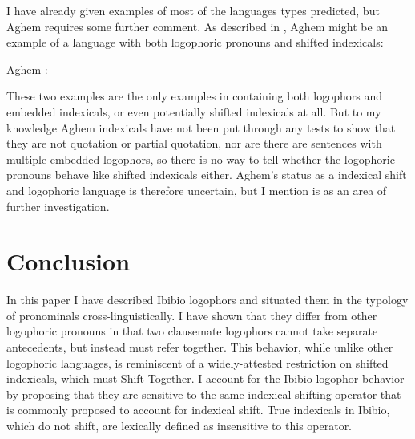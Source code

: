 \documentclass[output=paper]{langscibook}
\begin{document}
I have already given examples of most of the languages types predicted, but Aghem requires some further comment. As described in \citet{Hyman1979}, Aghem might be an example of a language with both logophoric pronouns and shifted indexicals:
\begin{exe}
\ex\label{aghem} Aghem \citep[14]{Hyman1979}:
\begin{xlist} \renewcommand{\eachwordone}{\tipaencoding}
	
\end{xlist}
\end{exe}
These two examples are the only examples in \citet{Hyman1979} containing both logophors and embedded indexicals, or even potentially shifted indexicals at all. But to my knowledge Aghem indexicals have not been put through any tests to show that they are not quotation or partial quotation, nor are there are sentences with multiple embedded logophors, so there is no way to tell whether the logophoric pronouns behave like shifted indexicals either. Aghem's status as a indexical shift and logophoric language is therefore uncertain, but I mention is as an area of further investigation.




\section{Conclusion}

In this paper I have described Ibibio logophors and situated them in the typology of  pronominals cross-linguistically. I have shown that they differ from other logophoric pronouns in that two clausemate logophors cannot take separate antecedents, but instead must refer together. This behavior, while unlike other logophoric languages, is reminiscent of a widely-attested restriction on shifted indexicals, which must Shift Together. I account for the Ibibio logophor behavior by proposing that they are sensitive to the same indexical shifting operator that is commonly proposed to account for indexical shift. True indexicals in Ibibio, which do not shift, are lexically defined as insensitive to this operator.
\end{document}
